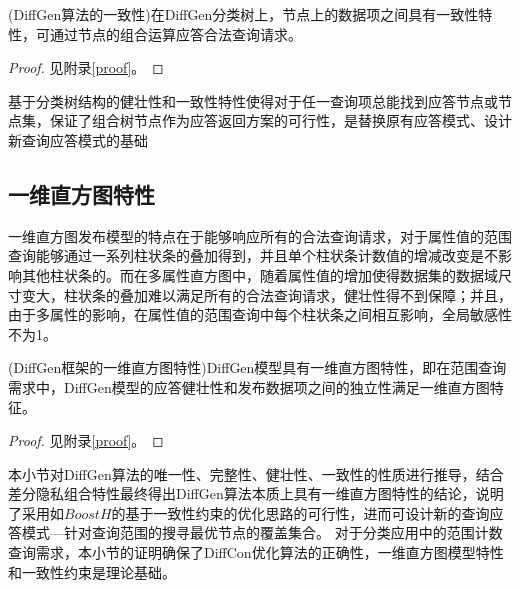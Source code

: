\begin{prop}
	\label{chap4_prop4}
	(DiffGen算法的一致性)在DiffGen分类树上，节点上的数据项之间具有一致性特性，可通过节点的组合运算应答合法查询请求。
\end{prop}
\begin{proof}
	见附录\ref{proof}。
\end{proof}

基于分类树结构的健壮性和一致性特性使得对于任一查询项总能找到应答节点或节点集，保证了组合树节点作为应答返回方案的可行性，是替换原有应答模式、设计新查询应答模式的基础


\subsection{一维直方图特性} %


一维直方图发布模型的特点在于能够响应所有的合法查询请求，对于属性值的范围查询能够通过一系列柱状条的叠加得到，并且单个柱状条计数值的增减改变是不影响其他柱状条的。而在多属性直方图中，随着属性值的增加使得数据集的数据域尺寸变大，柱状条的叠加难以满足所有的合法查询请求，健壮性得不到保障；并且，由于多属性的影响，在属性值的范围查询中每个柱状条之间相互影响，全局敏感性不为1。

\begin{prop}
	\label{chap4_prop5}
	(DiffGen框架的一维直方图特性)DiffGen模型具有一维直方图特性，即在范围查询需求中，DiffGen模型的应答健壮性和发布数据项之间的独立性满足一维直方图特征。
\end{prop}
\begin{proof}
	见附录\ref{proof}。
\end{proof}

本小节对DiffGen算法的唯一性、完整性、健壮性、一致性的性质进行推导，结合差分隐私组合特性最终得出DiffGen算法本质上具有一维直方图特性的结论，说明了采用如$BoostH$的基于一致性约束的优化思路的可行性，进而可设计新的查询应答模式---针对查询范围的搜寻最优节点的覆盖集合。
对于分类应用中的范围计数查询需求，本小节的证明确保了DiffCon优化算法的正确性，一维直方图模型特性和一致性约束是理论基础。


